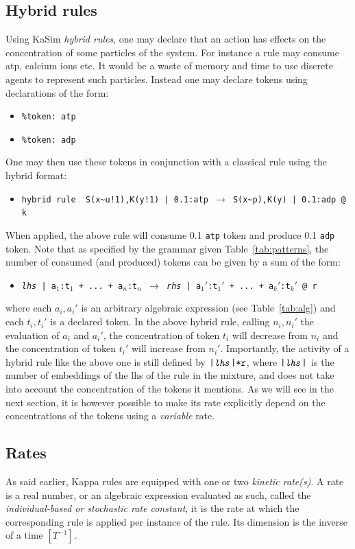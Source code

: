 \documentclass[11pt]{book}
\def\intstate{\textasciitilde}
\def\ttt#1{\texttt{#1}}
\def\var#1{{\textquotesingle}#1{\textquotesingle}}
\def\rar{\rightarrow}
\def\ITE#1{\begin{itemize}#1\end{itemize}}
\def\imp#1{\emph{#1}\index{#1}}
\begin{document}
\subsection{Hybrid rules}\label{sec:hybrid}

Using KaSim \imp{hybrid rules}, one may declare that an action has effects on the concentration of some particles of the system. For instance a rule may consume atp, calcium ions etc. It would be a waste of memory and time to use discrete agents to represent such particles. Instead one may declare tokens using declarations of the form:
\ITE{
\item[] \ttt{\%token: atp} 
\item[] \ttt{\%token: adp} 
}
One may then use these tokens in conjunction with a classical rule using the hybrid format:
\ITE{
\item[] \ttt{\var{hybrid rule}~ S(x\intstate u!1),K(y!1)\ |\ 0.1:atp $\rar$ S(x\intstate p),K(y)\ |\ 0.1:adp\ @ \var{k}} 
}
When applied, the above rule will consume 0.1 \ttt{atp} token and produce 0.1 \ttt{adp} token. Note that as specified by the grammar given Table~\ref{tab:patterns}, the number of consumed (and produced) tokens can be given by a sum of the form:
\ITE{
\item[] \ttt{\textit{lhs} | a$_1$:t$_1$ + ... + a$_n$:t$_n$ $\rar$ \textit{rhs} | a$_1'$:t$_1'$ + ... + a$_k'$:t$_k'$ @ r} 
}
where each $a_i,a_i'$ is an arbitrary algebraic expression (see Table~\ref{tab:alg}) and each $t_i,t_i'$ is a declared token. In the above hybrid rule, calling $n_i,n_i'$  the evaluation of $a_i$ and $a_i'$, the concentration of token $t_i$ will decrease from $n_i$ and the concentration of token $t_i'$ will increase from $n_i'$. Importantly, the activity of a hybrid rule like the above one is still 
defined by $\ttt{|\textit{lhs}|*r}$, where $\ttt{|\textit{lhs}|}$ is the number of embeddings of the lhs of the rule in the mixture, and does not take into account the concentration of the tokens it mentions. As we will see in the next section, it is however possible to make its rate explicitly depend on the concentrations of the tokens using a \imp{variable} rate.

\subsection{Rates}\label{sec:kinetics}
As said earlier, Kappa rules are equipped with one or two \emph{kinetic rate(s)}. A rate is a real number, or an algebraic expression evaluated as such, called the \emph{individual-based or stochastic rate constant}, it is the rate at which the corresponding rule is applied per instance of the rule. Its dimension is the inverse of a time $[T^{-1}]$.
\end{document}

